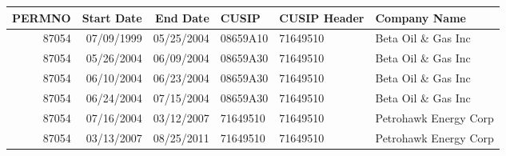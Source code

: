 

\begin{longtable}{ r r r l l l }\hline\hline          
   PERMNO &    Start Date &    End Date &    CUSIP &    CUSIP Header &    Company Name\\ 
          \hline\endhead
   87054 &    07/09/1999 &    05/25/2004 &    08659A10 &    71649510 &    Beta Oil \& Gas Inc\\ 
   87054 &    05/26/2004 &    06/09/2004 &    08659A30 &    71649510 &    Beta Oil \& Gas Inc\\ 
   87054 &    06/10/2004 &    06/23/2004 &    08659A30 &    71649510 &    Beta Oil \& Gas Inc\\ 
   87054 &    06/24/2004 &    07/15/2004 &    08659A30 &    71649510 &    Beta Oil \& Gas Inc\\ 
   87054 &    07/16/2004 &    03/12/2007 &    71649510 &    71649510 &    Petrohawk Energy Corp\\ 
   87054 &    03/13/2007 &    08/25/2011 &    71649510 &    71649510 &    Petrohawk Energy Corp\\ 
                    \hline\hline\end{longtable}


